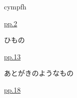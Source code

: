 \hspace*{4mm}
\begin{minipage}{131mm}
    \begin{minipage}{70mm}
        cympfh
    \end{minipage}
    \vspace*{-10mm}
    \begin{flushright}
        \hyperlink{page.2}{pp.2}
    \end{flushright}

    \begin{minipage}{70mm}
        ひもの
    \end{minipage}
    \vspace*{-10mm}
    \begin{flushright}
        \hyperlink{page.13}{pp.13}
    \end{flushright}

    \begin{minipage}{70mm}
        あとがきのようなもの
    \end{minipage}
    \vspace*{-10mm}
    \begin{flushright}
        \hyperlink{page.18}{pp.18}
    \end{flushright}

\end{minipage}
